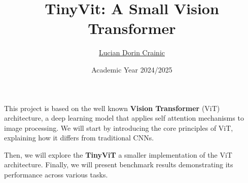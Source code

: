 \documentclass{beamer}
\title{TinyVit: A Small Vision Transformer}
\author{\href{mailto:crainic1938430@studenti.uniroma1.it}{Lucian Dorin Crainic}}
\date{Academic Year 2024/2025}
\begin{document}
\maketitle

\begin{frame}

  This project is based on the well known \textbf{Vision Transformer} (ViT) architecture, a deep learning model that applies self attention mechanisms to image processing. We will start by introducing the core principles of ViT, explaining how it differs from traditional CNNs.

  \vspace{\baselineskip}

  Then, we will explore the \textbf{TinyViT} a smaller implementation of the ViT architecture. Finally, we will present benchmark results demonstrating its performance across various tasks.

\end{frame}











\backmatter
\end{document}
